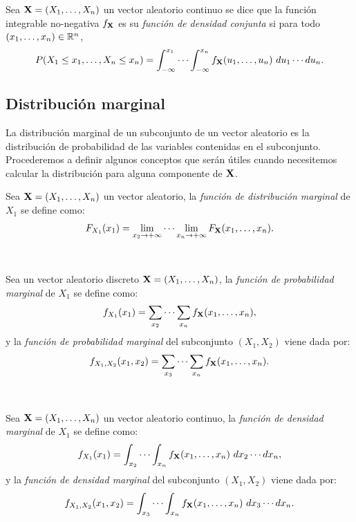 \documentclass[oneside,openright,titlepage,numbers=noenddot,openany,headinclude,footinclude=true,
cleardoublepage=empty,abstractoff,BCOR=5mm,paper=a4,fontsize=12pt,main=spanish]{scrreprt}
\begin{document}
\begin{definition}
Sea $\textbf{X}=(X_1,\dots,X_n)$ un vector aleatorio continuo se dice que la función integrable no-negativa $f_{\textbf{X}}$ es su \textit{función de densidad conjunta} si para todo $(x_1,\dots,x_n) \in \mathbb{R}^n$, $$P(X_1\leq x_1,\dots, X_n \leq x_n)=\int_{-\infty}^{x_1} \cdots \int_{-\infty}^{x_n} f_{\textbf{X}}(u_1,\dots,u_n) \ du_1 \cdots du_n.$$ 
\end{definition}

\subsection{Distribución marginal}

La distribución marginal de un subconjunto de un vector aleatorio es la distribución de probabilidad de las variables contenidas en el subconjunto. Procederemos a definir algunos conceptos que serán útiles cuando necesitemos calcular la distribución para alguna componente de $\textbf{X}$.\\

\begin{definition}
Sea $\textbf{X}=(X_1,\dots,X_n)$ un vector aleatorio, la \textit{función de distribución marginal} de $X_1$ se define como: $$F_{X_1}(x_1)=\lim_{x_2\to +\infty}\cdots \lim_{x_n\to +\infty} F_{\textbf{X}}(x_1,\dots,x_n).$$
\end{definition}\

\begin{definition}
Sea un vector aleatorio discreto $\textbf{X}=(X_1,\dots,X_n)$, la \textit{función de probabilidad marginal} de $X_1$ se define como: $$f_{X_1} (x_1)=\sum_{x_2} \cdots \sum_{x_n} f_{\textbf{X}}(x_1,\dots,x_n),$$ y la \textit{función de probabilidad marginal} del subconjunto $(X_1,X_2)$ viene dada por:$$f_{X_1,X_2} (x_1,x_2)=\sum_{x_3} \cdots \sum_{x_n} f_{\textbf{X}}(x_1,\dots,x_n).$$
\end{definition}\

\begin{definition}
Sea $\textbf{X}=(X_1,\dots,X_n)$ un vector aleatorio continuo, la \textit{función de densidad marginal} de $X_1$ se define como: $$f_{X_1}(x_1)=\int_{x_2} \cdots \int_{x_n} f_{\textbf{X}}(x_1,\dots,x_n) \ dx_2\cdots dx_n,$$
y la \textit{función de densidad marginal} del subconjunto $(X_1,X_2)$ viene dada por:
$$f_{X_1,X_2}(x_1,x_2)=\int_{x_3} \cdots \int_{x_n} f_{\textbf{X}}(x_1,\dots,x_n) \ dx_3\cdots dx_n.$$
\end{definition}
\end{document}
